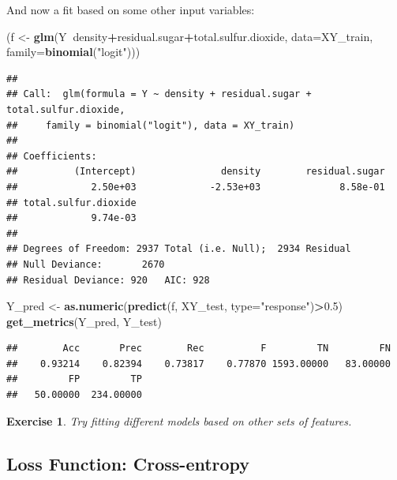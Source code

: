 \documentclass[10pt,b5paper,krantz1]{krantz}
\newenvironment{Shaded}{\begin{snugshade}}{\end{snugshade}}
\newcommand{\DataTypeTok}[1]{\textcolor[rgb]{0.27,0.27,0.27}{#1}}
\newcommand{\FloatTok}[1]{\textcolor[rgb]{0.06,0.06,0.06}{#1}}
\newcommand{\KeywordTok}[1]{\textcolor[rgb]{0.27,0.27,0.27}{\textbf{#1}}}
\newcommand{\NormalTok}[1]{#1}
\newcommand{\OperatorTok}[1]{\textcolor[rgb]{0.43,0.43,0.43}{\textbf{#1}}}
\newcommand{\StringTok}[1]{\textcolor[rgb]{0.5,0.5,0.5}{#1}}
\newtheorem{exercise}{Exercise}[chapter]
\begin{document}
And now a fit based on some other input variables:

\begin{Shaded}
\begin{Highlighting}[]
\NormalTok{(f <-}\StringTok{ }\KeywordTok{glm}\NormalTok{(Y}\OperatorTok{~}\NormalTok{density}\OperatorTok{+}\NormalTok{residual.sugar}\OperatorTok{+}\NormalTok{total.sulfur.dioxide,}
    \DataTypeTok{data=}\NormalTok{XY_train, }\DataTypeTok{family=}\KeywordTok{binomial}\NormalTok{(}\StringTok{"logit"}\NormalTok{)))}
\end{Highlighting}
\end{Shaded}

\begin{verbatim}
## 
## Call:  glm(formula = Y ~ density + residual.sugar + total.sulfur.dioxide, 
##     family = binomial("logit"), data = XY_train)
## 
## Coefficients:
##          (Intercept)               density        residual.sugar  
##             2.50e+03             -2.53e+03              8.58e-01  
## total.sulfur.dioxide  
##             9.74e-03  
## 
## Degrees of Freedom: 2937 Total (i.e. Null);  2934 Residual
## Null Deviance:       2670 
## Residual Deviance: 920   AIC: 928
\end{verbatim}

\begin{Shaded}
\begin{Highlighting}[]
\NormalTok{Y_pred <-}\StringTok{ }\KeywordTok{as.numeric}\NormalTok{(}\KeywordTok{predict}\NormalTok{(f, XY_test, }\DataTypeTok{type=}\StringTok{"response"}\NormalTok{)}\OperatorTok{>}\FloatTok{0.5}\NormalTok{)}
\KeywordTok{get_metrics}\NormalTok{(Y_pred, Y_test)}
\end{Highlighting}
\end{Shaded}

\begin{verbatim}
##        Acc       Prec        Rec          F         TN         FN 
##    0.93214    0.82394    0.73817    0.77870 1593.00000   83.00000 
##         FP         TP 
##   50.00000  234.00000
\end{verbatim}

\begin{exercise}

Try fitting different models based on other sets of features.

\end{exercise}

\hypertarget{loss-function-cross-entropy}{%
\subsection{Loss Function: Cross-entropy}\label{loss-function-cross-entropy}}
\end{document}
